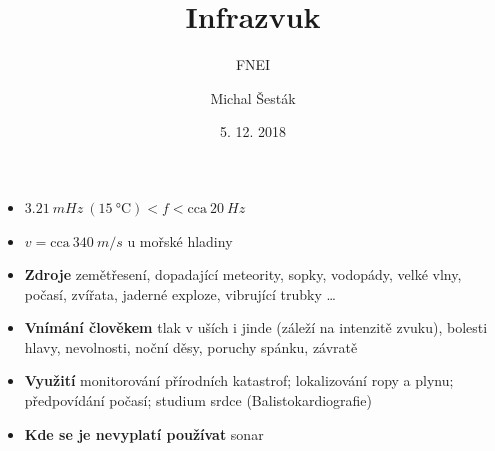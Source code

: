 \documentclass[10pt, notes=only]{beamer}
\author{Michal Šesták}
\title{Infrazvuk}
\subtitle{FNEI}
\institute{}
\date{5. 12. 2018}
\begin{document}
\renewcommand{\figurename}{Obr.}
\renewcommand{\tablename}{Tab.}

\maketitle


\begin{frame}
    \begin{itemize}
        \item $\SI{3,21}{mHz}\ (\SI{15}{\celsius})<f< \text{cca}\ \SI{20}{Hz}$ 
        \item $v=\text{cca}\ \SI{340}{m/s}$ u mořské hladiny
        \item \textbf{Zdroje} zemětřesení, dopadající meteority, sopky, vodopády, velké vlny, počasí, zvířata, jaderné exploze, vibrující trubky \dots
        \item \textbf{Vnímání člověkem} tlak v uších i jinde (záleží na intenzitě zvuku), bolesti hlavy, nevolnosti, noční děsy, poruchy spánku, závratě 
        \item \textbf{Využití} monitorování přírodních katastrof; lokalizování ropy a plynu; předpovídání počasí; studium srdce (Balistokardiografie)
        \item \textbf{Kde se je nevyplatí používat} sonar
    \end{itemize}
\end{frame}
\end{document}
